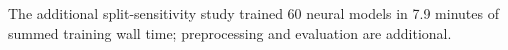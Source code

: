 The additional split-sensitivity study trained 60 neural models in 7.9 minutes of summed training wall time; preprocessing and evaluation are additional.
